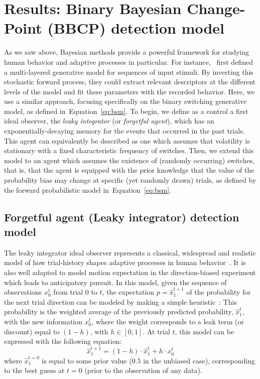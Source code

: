 \documentclass[10pt,letterpaper]{article}
\newcommand{\eql}[1]{\begin{equation}#1\end{equation}}
\newcommand{\citep}[1]{\cite{#1}}
\newcommand{\citet}[1]{\cite{#1}}
\newcommand{\seeEq}[1]{Equation~\ref{eq:#1}}
\begin{document}
\section*{Results: Binary Bayesian Change-Point (BBCP) detection model}
\label{sec:Bayesian_change_point}
%
%
As we saw above, Bayesian methods provide a powerful framework for studying human behavior and adaptive  processes in particular.
For instance,~\citet{Mathys11} first defined a multi-layered generative model for
sequences of input stimuli.
By inverting this stochastic forward process,
they could extract relevant descriptors at the different levels of the model
and fit these parameters with the recorded behavior.
Here, we use a similar approach, focusing specifically on the binary switching generative model,
as defined in~\seeEq{bsm}.
To begin, we define as a control a first ideal observer, the \textit{leaky integrator} (or \textit{forgetful agent}),
which has an exponentially-decaying memory for the events that occurred in the past trials.
This agent can equivalently be described as one
which assumes that volatility is stationary with a fixed characteristic frequency of switches.
Then, we extend this model to an agent
which assumes the existence of (randomly occurring) switches, that is,
that the agent is equipped with the prior knowledge
that the value of the probability bias may change
at specific (yet randomly drawn) trials,
as defined by the forward probabilistic model in~\seeEq{bsm}.
%
\subsection*{Forgetful agent (Leaky integrator) detection model}%
The leaky integrator ideal observer represents a classical, widespread and
realistic model of how trial-history shapes
adaptive processes in human behavior~\citet{Anderson2006}.
It is also well adapted to model motion expectation in the direction-biased experiment which leads to anticipatory pursuit.
In this model, given the sequence of observations $x_0^t$ from trial $0$ to $t$,
the expectation $p=\hat{x}_1^{t+1}$ of the probability for the next trial direction can be modeled by making a simple heuristic~\citep{Anderson2006}:
This probability is the weighted average of
the previously predicted probability, $\hat{x}_1^{t}$, with the new information $x_0^t$,
where the weight corresponds to a leak term (or discount)
equal to $(1 - h)$, with $h \in [0, 1]$.
At trial $t$, this model can be expressed with the following equation:
\eql{
\hat{x}_1^{t+1} = (1 - h) \cdot \hat{x}_1^{t} + h \cdot x_0^t
\label{eq:leaky}}
where $\hat{x}_1^{t=0}$ is equal to some prior value ($0.5$ in the unbiased case),
corresponding to the best guess at $t=0$ (prior to the observation of any data).
\end{document}
